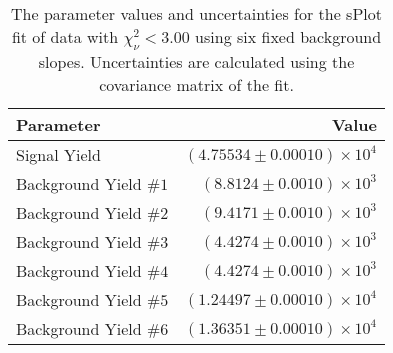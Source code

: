 
\begin{table}[ht]
    \begin{center}
        \begin{tabular}{lr}\toprule
            Parameter & Value \\\midrule
            Signal Yield & $(4.75534 \pm 0.00010) \times 10^{4}$ \\
            Background Yield $\#1$ & $(8.8124 \pm 0.0010) \times 10^{3}$ \\
            Background Yield $\#2$ & $(9.4171 \pm 0.0010) \times 10^{3}$ \\
            Background Yield $\#3$ & $(4.4274 \pm 0.0010) \times 10^{3}$ \\
            Background Yield $\#4$ & $(4.4274 \pm 0.0010) \times 10^{3}$ \\
            Background Yield $\#5$ & $(1.24497 \pm 0.00010) \times 10^{4}$ \\
            Background Yield $\#6$ & $(1.36351 \pm 0.00010) \times 10^{4}$ \\\bottomrule
        \end{tabular}
        \caption{The parameter values and uncertainties for the sPlot fit of data with $\chi^2_\nu < 3.00$ using six fixed background slopes. Uncertainties are calculated using the covariance matrix of the fit.}\label{tab:splot-fit-results-chisqdof-3.00-fixed-6}
    \end{center}
\end{table}
